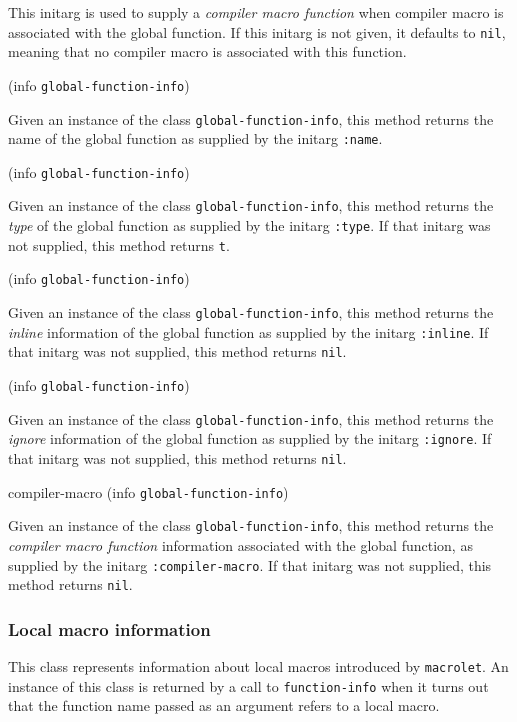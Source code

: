 
This initarg is used to supply a \emph{compiler macro function} when
compiler macro is associated with the global function.  If this
initarg is not given, it defaults to \texttt{nil}, meaning that no
compiler macro is associated with this function. 

 {(info {\tt global-function-info})}

Given an instance of the class \texttt{global-function-info}, this
method returns the name of the global function as supplied by the
initarg \texttt{:name}.

 {(info {\tt global-function-info})}

Given an instance of the class \texttt{global-function-info}, this
method returns the \emph{type} of the global function as supplied by the
initarg \texttt{:type}.  If that initarg was not supplied, this method
returns \texttt{t}.

 {(info {\tt global-function-info})}

Given an instance of the class \texttt{global-function-info}, this
method returns the \emph{inline} information of the global function as
supplied by the initarg \texttt{:inline}.  If that initarg was not
supplied, this method returns \texttt{nil}.

 {(info {\tt global-function-info})}

Given an instance of the class \texttt{global-function-info}, this
method returns the \emph{ignore} information of the global function as
supplied by the initarg \texttt{:ignore}.  If that initarg was not
supplied, this method returns \texttt{nil}.

\Defmethod compiler-macro {(info {\tt global-function-info})}

Given an instance of the class \texttt{global-function-info}, this
method returns the \emph{compiler macro function} information
associated with the global function, as supplied by the initarg
\texttt{:compiler-macro}.  If that initarg was not supplied, this
method returns \texttt{nil}.

\subsubsection{Local macro information}


This class represents information about local macros introduced by
\texttt{macrolet}.  An instance of this class is returned by a call to
\texttt{function-info} when it turns out that the function name passed
as an argument refers to a local macro.


